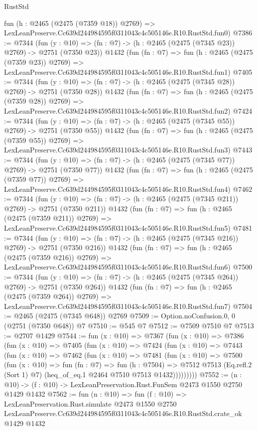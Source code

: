 \begin{lexlean}{RustStd}
\begin{coremodule}
    fun (h : @2465 (@2475 (@7359 @18)) @2769) =>
    LexLeanPreserve.Cc639d244984595f0311043c4c505146e.R10.RustStd.fun0)
@7386 := @7344
    (fun (y : @10) => (fn : @7) -> (h : @2465 (@2475 (@7345 @23)) @2769) -> @2751 (@7350 @23))
    @1432
    (fun (fn : @7) =>
    fun (h : @2465 (@2475 (@7359 @23)) @2769) =>
    LexLeanPreserve.Cc639d244984595f0311043c4c505146e.R10.RustStd.fun1)
@7405 := @7344
    (fun (y : @10) => (fn : @7) -> (h : @2465 (@2475 (@7345 @28)) @2769) -> @2751 (@7350 @28))
    @1432
    (fun (fn : @7) =>
    fun (h : @2465 (@2475 (@7359 @28)) @2769) =>
    LexLeanPreserve.Cc639d244984595f0311043c4c505146e.R10.RustStd.fun2)
@7424 := @7344
    (fun (y : @10) => (fn : @7) -> (h : @2465 (@2475 (@7345 @55)) @2769) -> @2751 (@7350 @55))
    @1432
    (fun (fn : @7) =>
    fun (h : @2465 (@2475 (@7359 @55)) @2769) =>
    LexLeanPreserve.Cc639d244984595f0311043c4c505146e.R10.RustStd.fun3)
@7443 := @7344
    (fun (y : @10) => (fn : @7) -> (h : @2465 (@2475 (@7345 @77)) @2769) -> @2751 (@7350 @77))
    @1432
    (fun (fn : @7) =>
    fun (h : @2465 (@2475 (@7359 @77)) @2769) =>
    LexLeanPreserve.Cc639d244984595f0311043c4c505146e.R10.RustStd.fun4)
@7462 := @7344
    (fun (y : @10) => (fn : @7) -> (h : @2465 (@2475 (@7345 @211)) @2769) -> @2751 (@7350 @211))
    @1432
    (fun (fn : @7) =>
    fun (h : @2465 (@2475 (@7359 @211)) @2769) =>
    LexLeanPreserve.Cc639d244984595f0311043c4c505146e.R10.RustStd.fun5)
@7481 := @7344
    (fun (y : @10) => (fn : @7) -> (h : @2465 (@2475 (@7345 @216)) @2769) -> @2751 (@7350 @216))
    @1432
    (fun (fn : @7) =>
    fun (h : @2465 (@2475 (@7359 @216)) @2769) =>
    LexLeanPreserve.Cc639d244984595f0311043c4c505146e.R10.RustStd.fun6)
@7500 := @7344
    (fun (y : @10) => (fn : @7) -> (h : @2465 (@2475 (@7345 @264)) @2769) -> @2751 (@7350 @264))
    @1432
    (fun (fn : @7) =>
    fun (h : @2465 (@2475 (@7359 @264)) @2769) =>
    LexLeanPreserve.Cc639d244984595f0311043c4c505146e.R10.RustStd.fun7)
@7504 := @2465 (@2475 (@7345 @648)) @2769
@7509 := Option.noConfusion.{0, 0} (@2751 (@7350 @648)) @7
@7510 := @545 @7
@7512 := @7509 @7510 @7
@7513 := @2707 @1429
@7544 := fun (x : @10) =>
  @7367
    (fun (x : @10) =>
    @7386
      (fun (x : @10) =>
      @7405
        (fun (x : @10) =>
        @7424
          (fun (x : @10) =>
          @7443
            (fun (x : @10) =>
            @7462
              (fun (x : @10) =>
              @7481
                (fun (x : @10) =>
                @7500
                  (fun (x : @10) =>
                  fun (fn : @7) =>
                  fun (h : @7504) =>
                  @7512
                    @7513
                    (Eq.refl.{2} (Sort 1) @7)
                    (heq_of_eq.{1} @2464 @7510 @7513 @1432)))))))))
@7552 := (n : @10) -> (f : @10) -> LexLeanPreservation.Rust.FunSem @2473 @1550 @2750 @1429 @1432
@7562 := fun (n : @10) =>
  fun (f : @10) =>
  LexLeanPreservation.Rust.simulate
    @2473
    @1550
    @2750
    LexLeanPreserve.Cc639d244984595f0311043c4c505146e.R10.RustStd.crate_ok
    @1429
    @1432
\end{coremodule}
\end{lexlean}
